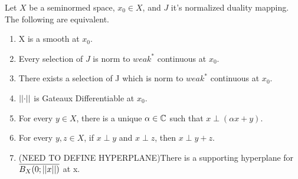 \begin{prop}
    \label{prop:smoothcharacterization}
    Let $X$ be a seminormed space, $x_0 \in X$, and $J$ it's normalized duality mapping. 
    The following are equivalent. 
    \begin{enumerate}
        \item X is a smooth at $x_0$.
        \item Every selection of $J$ is norm to $weak^*$ continuous at $x_0$.
        \item There exists a selection of J which is norm to $weak^*$ continuous at $x_0$.
        \item $\left|\left| \cdot \right|\right|$ is Gateaux Differentiable at $x_0$. 
        \item For every $y \in X$, there is a unique $\alpha \in \mathbb{C}$ such that $x \perp (\alpha x + y)$. 
        \item For every $y,z \in X$, if $x \perp y$ and $x \perp z$, then  $x \perp y + z$.
        \item (NEED TO DEFINE HYPERPLANE)There is a supporting hyperplane for $\overline{B_X(0;\left|\left| x \right|\right|)}$ at x. 
    \end{enumerate}
\end{prop} 

